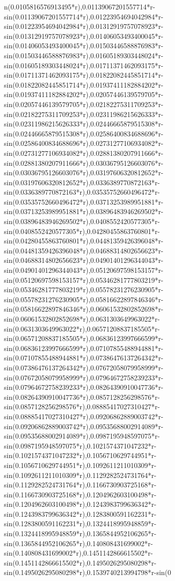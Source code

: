\documentclass[12pt,arial,letterpaper]{book}
\begin{document}
\begin{eulercomment}
\begin{eulercomment}
\begin{eulercomment}
\begin{eulercomment}
\begin{eulercomment}
\begin{eulercomment}
\begin{eulercomment}
\begin{eulercomment}
\begin{eulercomment}
\begin{eulercomment}
\begin{eulercomment}
\begin{eulercomment}
\begin{eulercomment}
\begin{eulercomment}
\begin{eulercomment}
\begin{eulercomment}
\begin{eulercomment}
\begin{eulercomment}
\begin{eulercomment}
\begin{eulercomment}
\begin{eulercomment}
\begin{eulercomment}
\begin{euleroutput}
n(0.0105816576913495*r),0.01139067201557714*r-sin(0.01139067201557714*r),0.01223954694042984*r-sin(0.01223954694042984*r),0.01312919757078923*r-sin(0.01312919757078923*r),0.01406053493400045*r-sin(0.01406053493400045*r),0.01503446588876983*r-sin(0.01503446588876983*r),0.01605189303448024*r-sin(0.01605189303448024*r),0.01711371462093175*r-sin(0.01711371462093175*r),0.01822082445851714*r-sin(0.01822082445851714*r),0.01937411182884202*r-sin(0.01937411182884202*r),0.02057446139579705*r-sin(0.02057446139579705*r),0.02182275311709253*r-sin(0.02182275311709253*r),0.02311986215626333*r-sin(0.02311986215626333*r),0.02446665879515308*r-sin(0.02446665879515308*r),0.02586400834688696*r-sin(0.02586400834688696*r),0.02731277106934082*r-sin(0.02731277106934082*r),0.02881380207911666*r-sin(0.02881380207911666*r),0.03036795126603076*r-sin(0.03036795126603076*r),0.03197606320812652*r-sin(0.03197606320812652*r),0.0336389770872163*r-sin(0.0336389770872163*r),0.03535752660496472*r-sin(0.03535752660496472*r),0.03713253989951881*r-sin(0.03713253989951881*r),0.03896483946269502*r-sin(0.03896483946269502*r),0.0408552420577305*r-sin(0.0408552420577305*r),0.04280455863760801*r-sin(0.04280455863760801*r),0.04481359426396048*r-sin(0.04481359426396048*r),0.04688314802656623*r-sin(0.04688314802656623*r),0.04901401296344043*r-sin(0.04901401296344043*r),0.05120697598153157*r-sin(0.05120697598153157*r),0.05346281777803219*r-sin(0.05346281777803219*r),0.05578231276230905*r-sin(0.05578231276230905*r),0.05816622897846346*r-sin(0.05816622897846346*r),0.06061532802852698*r-sin(0.06061532802852698*r),0.0631303649963022*r-sin(0.0631303649963022*r),0.06571208837185505*r-sin(0.06571208837185505*r),0.06836123997666599*r-sin(0.06836123997666599*r),0.07107855488944881*r-sin(0.07107855488944881*r),0.07386476137264342*r-sin(0.07386476137264342*r),0.07672058079958999*r-sin(0.07672058079958999*r),0.07964672758239233*r-sin(0.07964672758239233*r),0.08264390910047736*r-sin(0.08264390910047736*r),0.0857128256298576*r-sin(0.0857128256298576*r),0.08885417027310427*r-sin(0.08885417027310427*r),0.09206862889003742*r-sin(0.09206862889003742*r),0.09535688002914089*r-sin(0.09535688002914089*r),0.0987195948597075*r-sin(0.0987195948597075*r),0.1021574371047232*r-sin(0.1021574371047232*r),0.1056710629744951*r-sin(0.1056710629744951*r),0.1092611211010309*r-sin(0.1092611211010309*r),0.1129282524731764*r-sin(0.1129282524731764*r),0.1166730903725168*r-sin(0.1166730903725168*r),0.1204962603100498*r-sin(0.1204962603100498*r),0.1243983799636342*r-sin(0.1243983799636342*r),0.1283800591162231*r-sin(0.1283800591162231*r),0.1324418995948859*r-sin(0.1324418995948859*r),0.1365844952106265*r-sin(0.1365844952106265*r),0.140808431699002*r-sin(0.140808431699002*r),0.1451142866615502*r-sin(0.1451142866615502*r),0.1495026295080298*r-sin(0.1495026295080298*r),0.1539740213994798*r-sin(0
\end{euleroutput}
\end{eulercomment}
\end{eulercomment}
\end{eulercomment}
\end{eulercomment}
\end{eulercomment}
\end{eulercomment}
\end{eulercomment}
\end{eulercomment}
\end{eulercomment}
\end{eulercomment}
\end{eulercomment}
\end{eulercomment}
\end{eulercomment}
\end{eulercomment}
\end{eulercomment}
\end{eulercomment}
\end{eulercomment}
\end{eulercomment}
\end{eulercomment}
\end{eulercomment}
\end{eulercomment}
\end{eulercomment}
\end{document}
